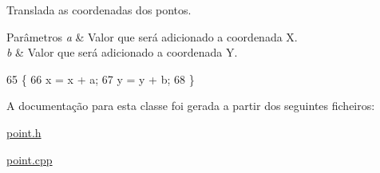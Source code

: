 Translada as coordenadas dos pontos. 


\begin{DoxyParams}{Parâmetros}
{\em a} & Valor que será adicionado a coordenada X. \\
\hline
{\em b} & Valor que será adicionado a coordenada Y. \\
\hline
\end{DoxyParams}

\begin{DoxyCode}
65 \{
66     x = x + a;
67     y = y + b;
68 \}
\end{DoxyCode}


A documentação para esta classe foi gerada a partir dos seguintes ficheiros\+:\begin{DoxyCompactItemize}
\item 
\mbox{\hyperlink{point_8h}{point.\+h}}\item 
\mbox{\hyperlink{point_8cpp}{point.\+cpp}}\end{DoxyCompactItemize}

